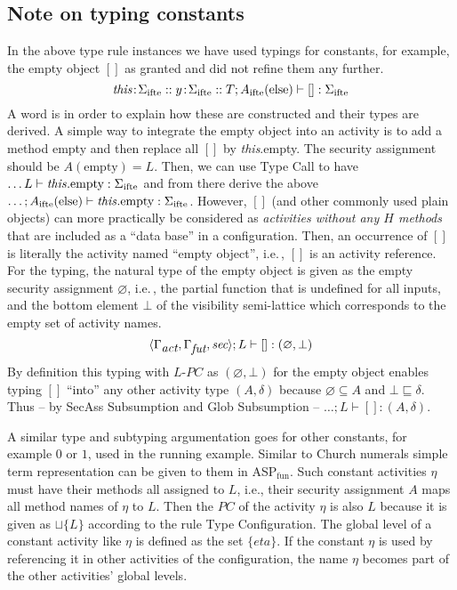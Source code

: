 \documentclass[10pt, conference, compsocconf]{IEEEtran}
\newcommand\aspfunp{ASP${}_\text{fun}$}
\newcommand{\symb}[1]{\makebox{\it #1}}
\newcommand{\coloncolon}{\mathrel{::}}
\newcommand\ie{i.e.\!\,, }
\begin{document}
{\subsection*{Note on typing constants}
In the above type rule instances we have used typings for constants, for example,
the empty object $[]$ as granted and did not refine them any further.
\[
\symb{this}\!:\! \Sigma_{\text{ifte}} \coloncolon y\!:\! \Sigma_{\text{ifte}} \coloncolon T; A_{\text{ifte}}(\text{else})\vdash [] :\Sigma_{\text{ifte}}
\]
A word is in order to explain how these are constructed and their types are derived. 
A simple way to integrate the empty object into an activity is to add a method empty and then 
replace all $[]$ by {\it this}.empty. The security assignment should be $A(\text{empty}) = L$. 
Then, we can use {\sc Type Call} to have $\dots L \vdash {\it this}.\text{empty}: \Sigma_{\text{ifte}}$ 
and from there derive the above 
$\dots;A_{\text{ifte}}(\text{else})\vdash {\it this}.\text{empty}: \Sigma_{\text{ifte}}$.
However, $[]$ (and other commonly used plain objects) can more practically be considered as
{\it activities without any $H$ methods} that are included as a ``data base''
in a configuration. Then, an occurrence of $[]$ is literally the activity named ``empty object'',
\ie $[]$ is an activity reference. 
For the typing, the natural type of the empty object is given as the empty security assignment 
$\varnothing$, \ie the partial function that is undefined for all inputs, and the
bottom element $\bot$ of the visibility semi-lattice which corresponds to the empty set of
activity names.
\[
\langle \Gamma_{\symb{act}}, \Gamma_{\symb{fut}}, \symb{sec} \rangle; L \vdash []: (\varnothing, \bot)
\]
By definition this typing with $L$-$PC$ as $(\varnothing, \bot)$ for the empty object enables
typing $[]$ ``into'' any other activity type $(A, \delta)$ because $\varnothing \subseteq A$ and
$\bot \sqsubseteq \delta$. Thus -- by {\sc SecAss Subsumption}  and {\sc Glob Subsumption} -- 
$\dots; L \vdash [] : (A, \delta)$. 

A similar type and subtyping argumentation goes for other constants, for example $0$ or $1$, used in
the running example. Similar to Church numerals simple term representation can be given to them
in \aspfunp. Such constant activities $\eta$ must have their methods all assigned to $L$, i.e.,
their security assignment $A$ maps all method names of $\eta$ to $L$. Then the
$PC$ of the activity $\eta$ is also $L$ because it is given as $\sqcup \{L\}$ according to 
the rule {\sc Type Configuration}. The global level of a constant activity like $\eta$ 
is defined as the set $\{eta\}$. If the constant $\eta$ is used by referencing
it in other activities of the configuration, the name $\eta$ becomes part of the
other activities' global levels.


}
\end{document}
